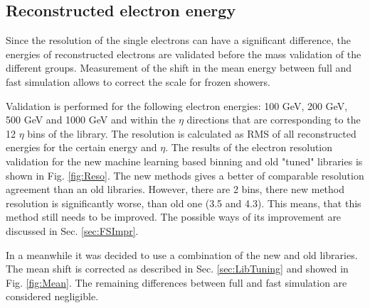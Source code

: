 {\subsection{Reconstructed electron energy}

Since the resolution of the single electrons can have a significant difference, the energies of reconstructed electrons are validated before the mass validation of the different groups. Measurement of the shift in the mean energy between full and fast simulation allows to correct the scale for frozen showers.

Validation is performed for the following electron energies: 100 GeV, 200 GeV, 500 GeV and 1000 GeV and within the $\eta$ directions that are corresponding to the 12 $\eta$ bins of the library. The resolution is calculated as RMS of all reconstructed energies for the certain energy and $\eta$. The results of the electron resolution validation for the new machine learning based binning and old "tuned" libraries is shown in Fig. \ref{fig:Reso}. The new methods gives a better of comparable resolution agreement than an old libraries. However, there are 2 bins, there new method resolution is significantly worse, than old one (3.5 and 4.3). This means, that this method still needs to be improved. The possible ways of its improvement are discussed in Sec. \ref{sec:FSImpr}.

In a meanwhile it was decided to use a combination of the new and old libraries. The mean shift is corrected as described in Sec. \ref{sec:LibTuning} and showed in Fig. \ref{fig:Mean}. The remaining differences between full and fast simulation are considered negligible.


}
